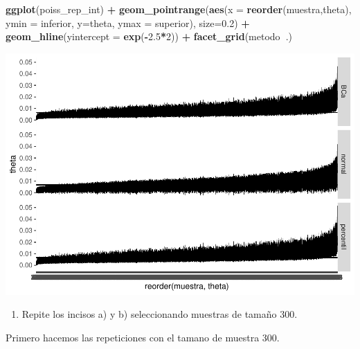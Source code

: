 \documentclass[]{article}
\newenvironment{Shaded}{\begin{snugshade}}{\end{snugshade}}
\newcommand{\DataTypeTok}[1]{\textcolor[rgb]{0.13,0.29,0.53}{#1}}
\newcommand{\DecValTok}[1]{\textcolor[rgb]{0.00,0.00,0.81}{#1}}
\newcommand{\FloatTok}[1]{\textcolor[rgb]{0.00,0.00,0.81}{#1}}
\newcommand{\KeywordTok}[1]{\textcolor[rgb]{0.13,0.29,0.53}{\textbf{#1}}}
\newcommand{\NormalTok}[1]{#1}
\newcommand{\OperatorTok}[1]{\textcolor[rgb]{0.81,0.36,0.00}{\textbf{#1}}}
\newcommand{\StringTok}[1]{\textcolor[rgb]{0.31,0.60,0.02}{#1}}
\providecommand{\tightlist}{%
  \setlength{\itemsep}{0pt}\setlength{\parskip}{0pt}}
\begin{document}
\begin{Shaded}
\begin{Highlighting}[]
  \KeywordTok{ggplot}\NormalTok{(poiss_rep_int) }\OperatorTok{+}
\StringTok{    }\KeywordTok{geom_pointrange}\NormalTok{(}\KeywordTok{aes}\NormalTok{(}\DataTypeTok{x =} \KeywordTok{reorder}\NormalTok{(muestra,theta),}
                        \DataTypeTok{ymin =}\NormalTok{ inferior,}
                        \DataTypeTok{y=}\NormalTok{theta,}
                        \DataTypeTok{ymax =}\NormalTok{ superior),}
                    \DataTypeTok{size=}\FloatTok{0.2}\NormalTok{) }\OperatorTok{+}
\StringTok{    }\KeywordTok{geom_hline}\NormalTok{(}\DataTypeTok{yintercept =} \KeywordTok{exp}\NormalTok{(}\OperatorTok{-}\FloatTok{2.5}\OperatorTok{*}\DecValTok{2}\NormalTok{)) }\OperatorTok{+}
\StringTok{    }\KeywordTok{facet_grid}\NormalTok{(metodo}\OperatorTok{~}\NormalTok{.)}
\end{Highlighting}
\end{Shaded}

\includegraphics{ExamenParcial_files/figure-latex/poisson grafica-1.pdf}

\begin{enumerate}
\def\labelenumi{\alph{enumi})}
\setcounter{enumi}{2}
\tightlist
\item
  Repite los incisos a) y b) seleccionando muestras de tamaño \(300\).
\end{enumerate}

Primero hacemos las repeticiones con el tamano de muestra 300.
\end{document}
